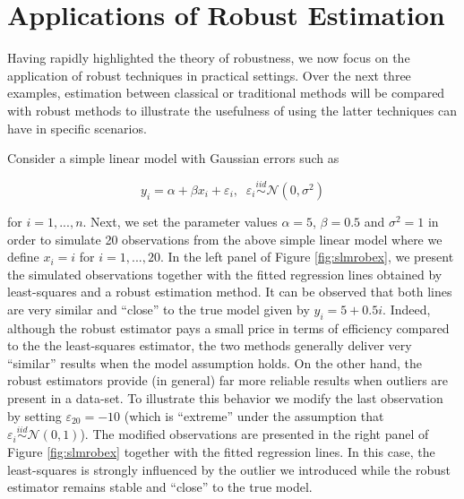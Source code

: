 \documentclass[]{book}
\theoremstyle{definition}
\theoremstyle{definition}
\theoremstyle{definition}
\theoremstyle{remark}
\let\BeginKnitrBlock\begin \let\EndKnitrBlock\end
\begin{document}
{\hypertarget{applications-of-robust-estimation}{%
\section{Applications of Robust
Estimation}\label{applications-of-robust-estimation}}

Having rapidly highlighted the theory of robustness, we now focus on the
application of robust techniques in practical settings. Over the next
three examples, estimation between classical or traditional methods will
be compared with robust methods to illustrate the usefulness of using
the latter techniques can have in specific scenarios.

\BeginKnitrBlock{example}
\protect\hypertarget{exm:slmrobust}{}{\label{exm:slmrobust} } Consider a
simple linear model with Gaussian errors such as

\begin{equation}
        y_i = \alpha + \beta x_i + \varepsilon_i, \;\; \varepsilon_i \overset{iid}{\sim} \mathcal{N}(0,\sigma^2)
  \label{eq:exam}
\end{equation}

for \(i = 1,...,n\). Next, we set the parameter values \(\alpha = 5\),
\(\beta = 0.5\) and \(\sigma^2 = 1\) in order to simulate 20
observations from the above simple linear model where we define
\(x_i = i\) for \(i = 1,...,20\). In the left panel of Figure
\ref{fig:slmrobex}, we present the simulated observations together with
the fitted regression lines obtained by least-squares and a robust
estimation method. It can be observed that both lines are very similar
and ``close'' to the true model given by \(y_i = 5 + 0.5 i\). Indeed,
although the robust estimator pays a small price in terms of efficiency
compared to the the least-squares estimator, the two methods generally
deliver very ``similar'' results when the model assumption holds. On the
other hand, the robust estimators provide (in general) far more reliable
results when outliers are present in a data-set. To illustrate this
behavior we modify the last observation by setting
\(\varepsilon_{20} = -10\) (which is ``extreme'' under the assumption
that \(\varepsilon_i \overset{iid}{\sim} \mathcal{N}(0,1)\)). The
modified observations are presented in the right panel of Figure
\ref{fig:slmrobex} together with the fitted regression lines. In this
case, the least-squares is strongly influenced by the outlier we
introduced while the robust estimator remains stable and ``close'' to
the true model.
\EndKnitrBlock{example}

}
\end{document}
